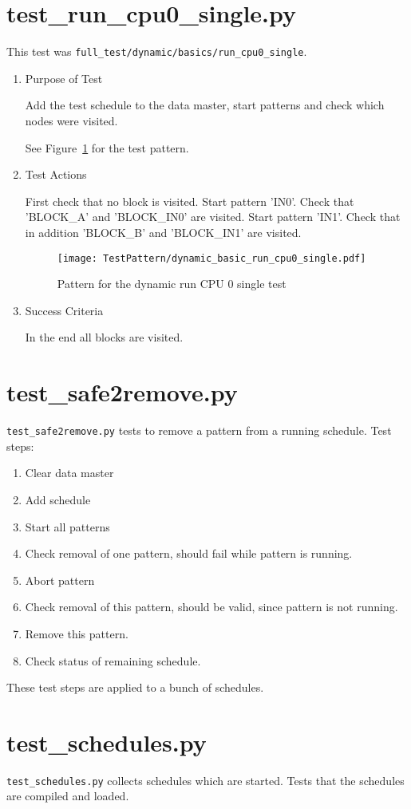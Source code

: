 \documentclass[12pt,a4paper]{report}
\begin{document}
\section{test\_run\_cpu0\_single.py}
This test was \texttt{full\_test/dynamic/basics/run\_cpu0\_single}.
\begin{enumerate}
	\item Purpose of Test

    Add the test schedule to the data master, start patterns and check which nodes were visited.

	See Figure~\ref{fig:Pattern_for_the_dynamic_run_CPU_0_single_test} for the test pattern.
	\item Test Actions

    First check that no block is visited. Start pattern 'IN0'. Check that 'BLOCK\_A' and 'BLOCK\_IN0' are visited.
    Start pattern 'IN1'. Check that in addition 'BLOCK\_B' and 'BLOCK\_IN1' are visited.
    \begin{figure}
        \centering
        \texttt{[image: TestPattern/dynamic\_basic\_run\_cpu0\_single.pdf]}
        \caption{Pattern for the dynamic run CPU 0 single test}
        \label{fig:Pattern_for_the_dynamic_run_CPU_0_single_test}
    \end{figure}
	\item Success Criteria

	In the end all blocks are visited.
\end{enumerate}
\section{test\_safe2remove.py}
\texttt{test\_safe2remove.py} tests to remove a pattern from a running schedule. Test steps:
\begin{enumerate}
\item Clear data master
\item Add schedule
\item Start all patterns
\item Check removal of one pattern, should fail while pattern is running.
\item Abort pattern
\item Check removal of this pattern, should be valid, since pattern is not running.
\item Remove this pattern.
\item Check status of remaining schedule.
\end{enumerate}
These test steps are applied to a bunch of schedules.
\section{test\_schedules.py}
\texttt{test\_schedules.py} collects schedules which are started. Tests that the schedules are compiled and loaded.
\end{document}
